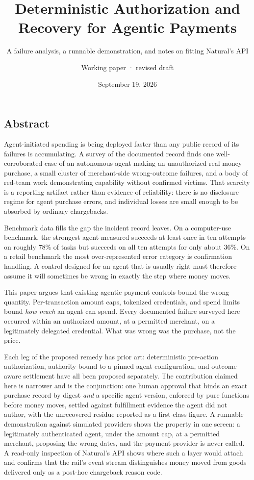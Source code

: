 \documentclass[
  11pt,
  letterpaper,
]{article}
\title{Deterministic Authorization and Recovery for Agentic Payments}
\subtitle{A failure analysis, a runnable demonstration, and notes on
fitting Natural's API}
\author{Working paper · revised draft}
\date{September 19, 2026}
\begin{document}
\maketitle

\subsection{Abstract}\label{abstract}

Agent-initiated spending is being deployed faster than any public record
of its failures is accumulating. A survey of the documented record finds
one well-corroborated case of an autonomous agent making an unauthorized
real-money purchase, a small cluster of merchant-side wrong-outcome
failures, and a body of red-team work demonstrating capability without
confirmed victims. That scarcity is a reporting artifact rather than
evidence of reliability: there is no disclosure regime for agent
purchase errors, and individual losses are small enough to be absorbed
by ordinary chargebacks.

Benchmark data fills the gap the incident record leaves. On a
computer-use benchmark, the strongest agent measured succeeds at least
once in ten attempts on roughly 78\% of tasks but succeeds on all ten
attempts for only about 36\%. On a retail benchmark the most
over-represented error category is confirmation handling. A control
designed for an agent that is usually right must therefore assume it
will sometimes be wrong in exactly the step where money moves.

This paper argues that existing agentic payment controls bound the wrong
quantity. Per-transaction amount caps, tokenized credentials, and spend
limits bound \emph{how much} an agent can spend. Every documented
failure surveyed here occurred within an authorized amount, at a
permitted merchant, on a legitimately delegated credential. What was
wrong was the purchase, not the price.

Each leg of the proposed remedy has prior art: deterministic pre-action
authorization, authority bound to a pinned agent configuration, and
outcome-aware settlement have all been proposed separately. The
contribution claimed here is narrower and is the conjunction: one human
approval that binds an exact purchase record by digest \emph{and} a
specific agent version, enforced by pure functions before money moves,
settled against fulfillment evidence the agent did not author, with the
unrecovered residue reported as a first-class figure. A runnable
demonstration against simulated providers shows the property in one
screen: a legitimately authenticated agent, under the amount cap, at a
permitted merchant, proposing the wrong dates, and the payment provider
is never called. A read-only inspection of Natural's API shows where
such a layer would attach and confirms that the rail's event stream
distinguishes money moved from goods delivered only as a post-hoc
chargeback reason code.
\end{document}
